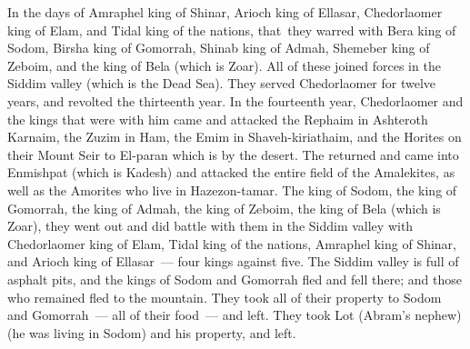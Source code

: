 
\begin{inparaenum}
     In the days of Amraphel king of Shinar, Arioch king of Ellasar, Chedorlaomer king of Elam, and Tidal king of the nations,%
     that\understood\ they warred with Bera king of Sodom, Birsha king of Gomorrah, Shinab king of Admah, Shemeber king of Zeboim, and the king of Bela (which is Zoar).%
     All of these joined forces in the Siddim valley (which is the Dead Sea).%
     They served Chedorlaomer for twelve years, and revolted the thirteenth year.%
     In the fourteenth year, Chedorlaomer and the kings that were with him came and attacked the Rephaim in Ashteroth Karnaim, the Zuzim in Ham, the Emim in Shaveh-kiriathaim,%
     and the Horites on their Mount Seir to El-paran which is by the desert.%
     The returned and came into Enmishpat (which is Kadesh) and attacked the entire field of the Amalekites, as well as the Amorites who live in Hazezon-tamar.%
     The king of Sodom, the king of Gomorrah, the king of Admah, the king of Zeboim, the king of Bela (which is Zoar), they went out and did battle with them in the Siddim valley%
     with Chedorlaomer king of Elam, Tidal king of the nations, Amraphel king of Shinar, and Arioch king of Ellasar~--- four kings against five.%
     The Siddim valley is full of asphalt pits, and the kings of Sodom and Gomorrah fled and fell there; and those who remained fled to the mountain.%
     They took all of their property to Sodom and Gomorrah~--- all of their food~--- and left.%
     They took Lot (Abram's nephew) (he was living in Sodom) and his property, and left.%

\end{inparaenum}

